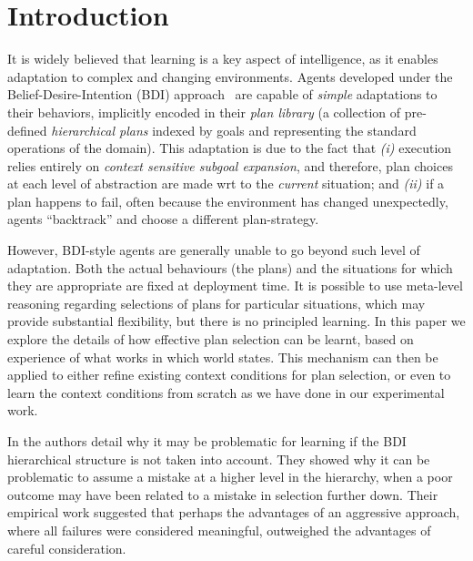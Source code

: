 \section{Introduction}\label{sec:intro}



It is widely believed that learning is a key aspect of intelligence, as
it enables adaptation to complex and changing environments.  
%
Agents developed under the Belief-Desire-Intention (BDI)
approach~\cite{Bratman88} are capable of \textit{simple} adaptations to their
behaviors, implicitly encoded in their \textit{plan library} (a collection of
pre-defined \textit{hierarchical plans} indexed by goals and representing the
standard operations of the domain).
%
This adaptation is due to the fact that \textit{(i)} execution relies entirely
on \textit{context sensitive subgoal expansion}, and therefore, plan choices at
each level of abstraction  are made wrt to the \textit{current}
situation; and  \textit{(ii)} if a plan happens to fail, often because the
environment has changed unexpectedly, agents ``backtrack'' and choose a
different plan-strategy.

However, BDI-style agents are generally unable to go beyond such level of
adaptation. Both the actual behaviours (the plans) and the situations
for which they are appropriate are fixed at deployment time. It is
possible to use meta-level reasoning regarding selections of plans for
particular situations, which may provide substantial flexibility, but
there is no principled learning. In this paper we explore the details
of how effective plan selection can be learnt, based on experience of
what works in which world states.  This mechanism can then be applied
to either refine existing context conditions for plan selection, or
even to learn the context conditions from scratch as we have done in
our experimental work.


In \cite{APSS08} the authors detail why it may be problematic for
learning if the BDI hierarchical structure is not taken into account.
They showed why it can be problematic to assume a mistake at a
higher level in the hierarchy, when a poor outcome may have been
related to a mistake in selection further down.  Their
empirical work suggested that perhaps the advantages of an aggressive
approach, where all failures were considered meaningful, outweighed
the advantages of careful consideration.

